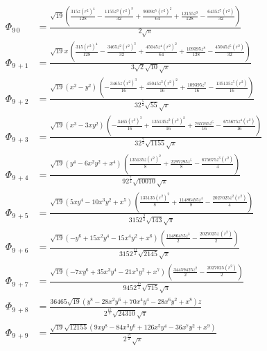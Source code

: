 \documentclass[10pt]{article}
\begin{document}
\begin{align*}
\Phi_{9\, 0} &= \frac{\sqrt{19} \left( \frac{315 z {{\left( r^2\right) }^{4}}}{128}-\frac{1155 {{z}^{3}} {{\left( r^2\right) }^{3}}}{32}+\frac{9009 {{z}^{5}} {{\left( r^2\right) }^{2}}}{64}+\frac{12155 {{z}^{9}}}{128}-\frac{6435 {{z}^{7}} \left( r^2\right) }{32}\right) }{2 \sqrt{\ensuremath{\pi} }} \\
\Phi_{9\, +1} &= \frac{\sqrt{19} x\, \left( \frac{315 {{\left( r^2\right) }^{4}}}{128}-\frac{3465 {{z}^{2}} {{\left( r^2\right) }^{3}}}{32}+\frac{45045 {{z}^{4}} {{\left( r^2\right) }^{2}}}{64}+\frac{109395 {{z}^{8}}}{128}-\frac{45045 {{z}^{6}} \left( r^2\right) }{32}\right) }{3 \sqrt{2} \sqrt{10} \sqrt{\ensuremath{\pi} }} \\
\Phi_{9\, +2} &= \frac{\sqrt{19} \left( {{x}^{2}}-{{y}^{2}}\right) \, \left( -\frac{3465 z {{\left( r^2\right) }^{3}}}{16}+\frac{45045 {{z}^{3}} {{\left( r^2\right) }^{2}}}{16}+\frac{109395 {{z}^{7}}}{16}-\frac{135135 {{z}^{5}} \left( r^2\right) }{16}\right) }{3 {{2}^{\frac{5}{2}}} \sqrt{55} \sqrt{\ensuremath{\pi} }} \\
\Phi_{9\, +3} &= \frac{\sqrt{19} \left( {{x}^{3}}-3 x {{y}^{2}}\right) \, \left( -\frac{3465 {{\left( r^2\right) }^{3}}}{16}+\frac{135135 {{z}^{2}} {{\left( r^2\right) }^{2}}}{16}+\frac{765765 {{z}^{6}}}{16}-\frac{675675 {{z}^{4}} \left( r^2\right) }{16}\right) }{3 {{2}^{\frac{7}{2}}} \sqrt{1155} \sqrt{\ensuremath{\pi} }} \\
\Phi_{9\, +4} &= \frac{\sqrt{19} \left( {{y}^{4}}-6 {{x}^{2}} {{y}^{2}}+{{x}^{4}}\right) \, \left( \frac{135135 z {{\left( r^2\right) }^{2}}}{8}+\frac{2297295 {{z}^{5}}}{8}-\frac{675675 {{z}^{3}} \left( r^2\right) }{4}\right) }{9 {{2}^{\frac{7}{2}}} \sqrt{10010} \sqrt{\ensuremath{\pi} }} \\
\Phi_{9\, +5} &= \frac{\sqrt{19} \left( 5 x {{y}^{4}}-10 {{x}^{3}} {{y}^{2}}+{{x}^{5}}\right) \, \left( \frac{135135 {{\left( r^2\right) }^{2}}}{8}+\frac{11486475 {{z}^{4}}}{8}-\frac{2027025 {{z}^{2}} \left( r^2\right) }{4}\right) }{315 {{2}^{\frac{9}{2}}} \sqrt{143} \sqrt{\ensuremath{\pi} }} \\
\Phi_{9\, +6} &= \frac{\sqrt{19} \left( -{{y}^{6}}+15 {{x}^{2}} {{y}^{4}}-15 {{x}^{4}} {{y}^{2}}+{{x}^{6}}\right) \, \left( \frac{11486475 {{z}^{3}}}{2}-\frac{2027025 z\, \left( r^2\right) }{2}\right) }{315 {{2}^{\frac{11}{2}}} \sqrt{2145} \sqrt{\ensuremath{\pi} }} \\
\Phi_{9\, +7} &= \frac{\sqrt{19} \left( -7 x {{y}^{6}}+35 {{x}^{3}} {{y}^{4}}-21 {{x}^{5}} {{y}^{2}}+{{x}^{7}}\right) \, \left( \frac{34459425 {{z}^{2}}}{2}-\frac{2027025 \left( r^2\right) }{2}\right) }{945 {{2}^{\frac{15}{2}}} \sqrt{715} \sqrt{\ensuremath{\pi} }} \\
\Phi_{9\, +8} &= \frac{36465 \sqrt{19} \left( {{y}^{8}}-28 {{x}^{2}} {{y}^{6}}+70 {{x}^{4}} {{y}^{4}}-28 {{x}^{6}} {{y}^{2}}+{{x}^{8}}\right)  z}{{{2}^{\frac{15}{2}}} \sqrt{24310} \sqrt{\ensuremath{\pi} }} \\
\Phi_{9\, +9} &= \frac{\sqrt{19} \sqrt{12155} \left( 9 x {{y}^{8}}-84 {{x}^{3}} {{y}^{6}}+126 {{x}^{5}} {{y}^{4}}-36 {{x}^{7}} {{y}^{2}}+{{x}^{9}}\right) }{{{2}^{\frac{17}{2}}} \sqrt{\ensuremath{\pi} }} 
\end{align*}
\end{document}
